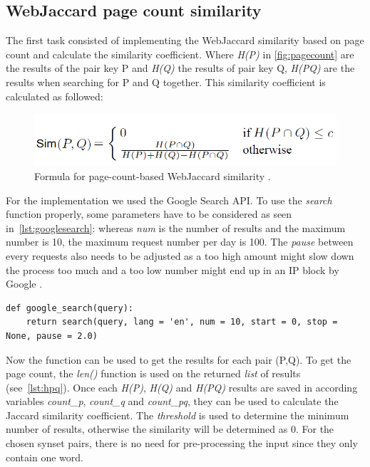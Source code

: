 \documentclass[conference]{IEEEtran}
\begin{document}
\subsection{WebJaccard page count similarity}\label{subsec:webjac}
The first task consisted of implementing the WebJaccard similarity based on page count and calculate the similarity coefficient. Where \textit{H(P)} in \ref{fig:pagecount} are the results of the pair key P and \textit{H(Q)} the results of pair key Q, \textit{H(PQ)} are the results when searching for P and Q together. This similarity coefficient  is calculated as followed:
\begin{figure}[h]\label{fig:pagecount}
\centerline{\includegraphics[scale=0.6]{img/pagecount.png}}
\caption{Formula for page-count-based WebJaccard similarity \cite{websim}.}
\label{fig}
\end{figure}

For the implementation we used the Google Search API. To use the \textit{search} function properly, some parameters have to be considered as seen in~\ref{lst:googlesearch}: whereas \textit{num} is the number of results and the maximum number is 10, the maximum request number per day is 100. The \textit{pause} between every requests also needs to be adjusted as a too high amount might slow down the process too much and a too low number might end up in an IP block by Google \cite{search}.

\begin{lstlisting}[frame=single, label=lst:googlesearch, caption={Google search function}, captionpos=b]
def google_search(query):
    return search(query, lang = 'en', num = 10, start = 0, stop = None, pause = 2.0)
\end{lstlisting}

Now the function can be used to get the results for each pair (P,Q). To get the page count, the \textit{len()} function is used on the returned \textit{list} of results (see~\ref{lst:hpq}). Once each \textit{H(P)}, \textit{H(Q)} and \textit{H(PQ)} results are saved in according variables \textit{count\_p}, \textit{count\_q} and \textit{count\_pq}, they can be used to calculate the Jaccard similarity coefficient. The \textit{threshold} is used to determine the minimum number of results, otherwise the similarity will be determined as 0. For the chosen synset pairs, there is no need for pre-processing the input since they only contain one word.
\end{document}
